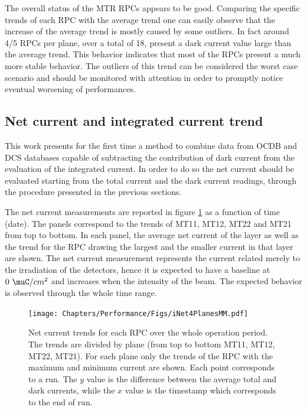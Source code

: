 The overall status of the MTR RPCs appears to be good.
Comparing the specific trends of each RPC with the average trend one can easily observe that the increase of the average trend is mostly caused by some outliers.
In fact around 4/5 RPCs per plane, over a total of 18, present a dark current value large than the average trend.
This behavior indicates that most of the RPCs present a much more stable behavior.
The outliers of this trend can be considered the worst case scenario and should be monitored with attention in order to promptly notice eventual worsening of performances.

\subsection{Net current and integrated current trend}
This work presents for the first time a method to combine data from OCDB and DCS databases capable of subtracting the contribution of dark current from the evaluation of the integrated current.
In order to do so the net current should be evaluated starting from the total current and the dark current readings, through the procedure presented in the previous sections.

The net current measurements are reported in figure \ref{fig:iNet4Planes} as a function of time (date).
The panels correspond to the trends of MT11, MT12, MT22 and MT21 from top to bottom.
In each panel, the average net current of the layer as well as the trend for the RPC drawing the largest and the smaller current in that layer are shown.
The net current measurement represents the current related merely to the irradiation of the detectors, hence it is expected to have a baseline at $0\ \muC/cm^2$ and increases when the intensity of the beam.
The expected behavior is observed through the whole time range.

\begin{figure}[!t]
\begin{center}
\texttt{[image: Chapters/Performance/Figs/iNet4PlanesMM.pdf]}
\caption{Net current trends for each RPC over the whole operation period. The trends are divided by plane (from top to bottom MT11, MT12, MT22, MT21). For each plane only the trends of the RPC with the maximum and minimum current are shown. Each point corresponds to a run. The $y$ value is the difference between the average total and dark currents, while the $x$ value is the timestamp which corresponds to the end of run.}
\label{fig:iNet4Planes}
\end{center}
\end{figure}

